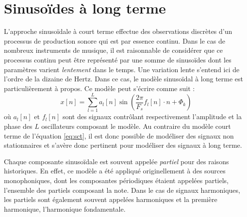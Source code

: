 
\section{ \nmu Sinusoïdes à long terme}  \label{sec:slt}

L'approche sinusoïdale à court terme effectue des observations discrètes d'un processus de production sonore qui est par essence continu. Dans le cas de nombreux instruments de musique, il est raisonnable de considérer que ce processus continu peut être représenté par une somme de sinusoïdes dont les paramètres varient \textsl{lentement} dans le temps. Une variation lente s'entend ici de l'ordre de la dizaine de Hertz. Dans ce cas, le modèle sinusoïdal à long terme est particulièrement à propos. Ce modèle peut s'écrire comme suit :
\begin{equation}
x[n]=\sum_{l=1}^{L} a_{l}[n] \sin \left(\frac{2 \pi}{F_{s}} f_{l}[n] \cdot n + \Phi_k \right)
\label{eq:slt}
\end{equation}
où $a_{l}[n]$ et $f_{l}[n]$ sont des signaux contrôlant respectivement l'amplitude et la phase des $L$ oscillateurs composant le modèle. Au contraire du modèle court terme de l'équation \ref{eq:sct}, il est donc possible de modéliser des signaux non stationnaires et s'avère donc pertinent pour modéliser des signaux à long terme.

Chaque composante sinusoïdale est souvent appelée \textsl{partiel} pour des raisons historiques. En effet, ce modèle a été appliqué originellement à des sources monophoniques, dont les composantes périodiques étaient appelées partiels, l'ensemble des partiels composant la note. Dans le cas de signaux harmoniques, les partiels sont également souvent appelées harmoniques et la première harmonique, l'harmonique fondamentale.



